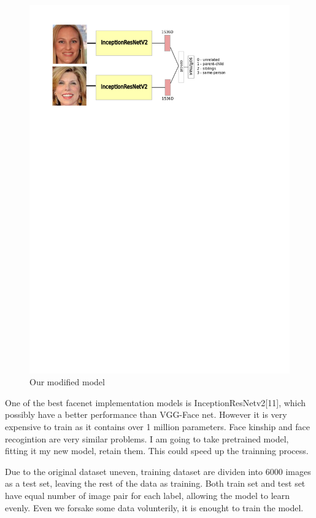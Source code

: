 \documentclass{article}
\begin{document}
\begin{figure}[h]
	\caption{Our modified model}
	\includegraphics[width=1\textwidth]{img/model_pic1}
	\centering
\end{figure}

One of the best facenet implementation models is InceptionResNetv2[11], which
possibly have a better performance than VGG-Face net. However it is very
expensive to train as it contains over 1 million parameters. Face kinship and
face recogintion are very similar problems. I am going to take pretrained
model, fitting it my new model, retain them. This could speed up the trainning
process.

Due to the original dataset uneven, training dataset are dividen into 6000
images as a test set, leaving the rest of the data as training. Both train set
and test set have equal number of image pair for each label, allowing the model
to learn evenly. Even we forsake some data volunterily, it is enought to train
the model.
\end{document}

